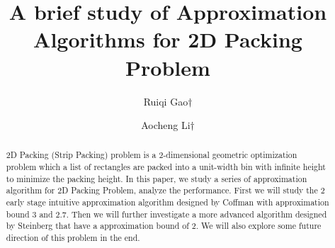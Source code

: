 \documentclass[sigplan,screen,nonacm]{acmart}\settopmatter{printfolios=true,printccs=false,printacmref=false}
\begin{document}
\sloppy

\title{A brief study of Approximation Algorithms for 2D Packing Problem}

\author{Ruiqi Gao$\dagger$}
\author{Aocheng Li$\dagger$}




\begin{abstract}
  2D Packing (Strip Packing) problem is a 2-dimensional geometric optimization problem which a list of rectangles are packed into a unit-width bin with infinite height to minimize the packing height. In this paper, we study a series of approximation algorithm for 2D Packing Problem, analyze the performance. First we will study the 2 early stage intuitive approximation algorithm designed by Coffman with approximation bound 3 and 2.7. Then we will further investigate a more advanced algorithm designed by Steinberg that have a approximation bound of 2. We will also explore some future direction of this problem in the end.
\end{abstract}



\end{document}
